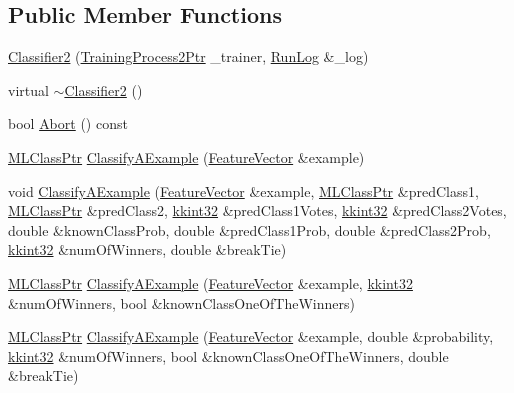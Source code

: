 \subsection*{Public Member Functions}
\begin{DoxyCompactItemize}
\item 
\hyperlink{class_k_k_m_l_l_1_1_classifier2_a8356534134498280452391909bd112cb}{Classifier2} (\hyperlink{namespace_k_k_m_l_l_a1fd087a9fde5db46fe14f6e98f994a71}{Training\+Process2\+Ptr} \+\_\+trainer, \hyperlink{class_k_k_b_1_1_run_log}{Run\+Log} \&\+\_\+log)
\item 
virtual \hyperlink{class_k_k_m_l_l_1_1_classifier2_a5f1f1726f4699f177571e810715c21cc}{$\sim$\+Classifier2} ()
\item 
bool \hyperlink{class_k_k_m_l_l_1_1_classifier2_a363db3bed8c89a75e82cfe6c483dc0f6}{Abort} () const 
\item 
\hyperlink{namespace_k_k_m_l_l_ac272393853d59e72e8456f14cd6d8c23}{M\+L\+Class\+Ptr} \hyperlink{class_k_k_m_l_l_1_1_classifier2_a071ddf2533fbd732558aa8bcfd9f1878}{Classify\+A\+Example} (\hyperlink{class_k_k_m_l_l_1_1_feature_vector}{Feature\+Vector} \&example)
\item 
void \hyperlink{class_k_k_m_l_l_1_1_classifier2_a616733521656bf3395acf877ca83737a}{Classify\+A\+Example} (\hyperlink{class_k_k_m_l_l_1_1_feature_vector}{Feature\+Vector} \&example, \hyperlink{namespace_k_k_m_l_l_ac272393853d59e72e8456f14cd6d8c23}{M\+L\+Class\+Ptr} \&pred\+Class1, \hyperlink{namespace_k_k_m_l_l_ac272393853d59e72e8456f14cd6d8c23}{M\+L\+Class\+Ptr} \&pred\+Class2, \hyperlink{namespace_k_k_b_a8fa4952cc84fda1de4bec1fbdd8d5b1b}{kkint32} \&pred\+Class1\+Votes, \hyperlink{namespace_k_k_b_a8fa4952cc84fda1de4bec1fbdd8d5b1b}{kkint32} \&pred\+Class2\+Votes, double \&known\+Class\+Prob, double \&pred\+Class1\+Prob, double \&pred\+Class2\+Prob, \hyperlink{namespace_k_k_b_a8fa4952cc84fda1de4bec1fbdd8d5b1b}{kkint32} \&num\+Of\+Winners, double \&break\+Tie)
\item 
\hyperlink{namespace_k_k_m_l_l_ac272393853d59e72e8456f14cd6d8c23}{M\+L\+Class\+Ptr} \hyperlink{class_k_k_m_l_l_1_1_classifier2_abad3ac9d6709f8855c9c5db9858d9704}{Classify\+A\+Example} (\hyperlink{class_k_k_m_l_l_1_1_feature_vector}{Feature\+Vector} \&example, \hyperlink{namespace_k_k_b_a8fa4952cc84fda1de4bec1fbdd8d5b1b}{kkint32} \&num\+Of\+Winners, bool \&known\+Class\+One\+Of\+The\+Winners)
\item 
\hyperlink{namespace_k_k_m_l_l_ac272393853d59e72e8456f14cd6d8c23}{M\+L\+Class\+Ptr} \hyperlink{class_k_k_m_l_l_1_1_classifier2_af570ed0c5ea30166d605e4ad4cc43f81}{Classify\+A\+Example} (\hyperlink{class_k_k_m_l_l_1_1_feature_vector}{Feature\+Vector} \&example, double \&probability, \hyperlink{namespace_k_k_b_a8fa4952cc84fda1de4bec1fbdd8d5b1b}{kkint32} \&num\+Of\+Winners, bool \&known\+Class\+One\+Of\+The\+Winners, double \&break\+Tie)

\end{DoxyCompactItemize}
